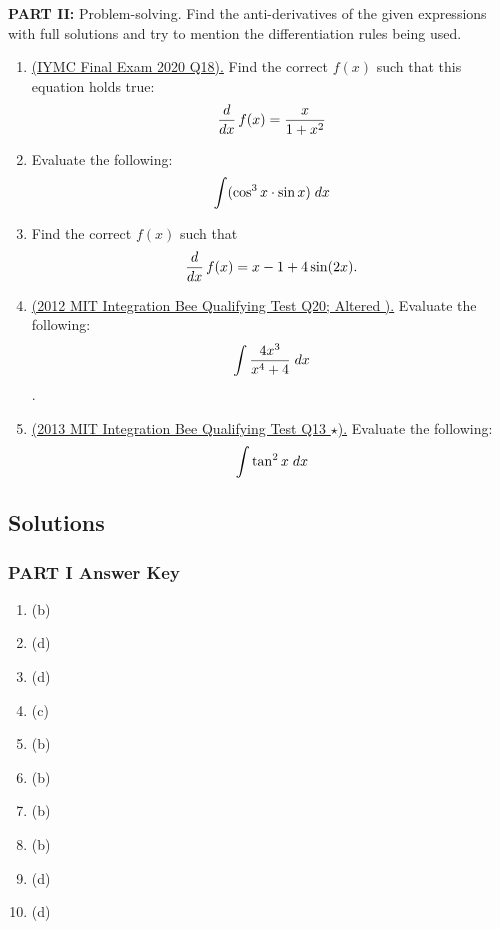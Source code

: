\documentclass[10pt,paper=letter]{scrartcl}
\begin{document}
\raggedright \textbf{PART II:} Problem-solving. Find the anti-derivatives of the given expressions with full solutions and try to mention the differentiation rules being used.

\begin{enumerate}[resume, label=\arabic*.,font=\bfseries]

\item \textsf{\href{https://iymc.info/docs/problems/2020/Final-Exam-2020.pdf}{(IYMC Final Exam 2020 Q18).}}  Find the correct $f(x)$ such that this equation holds true: $$\frac{d}{dx}\, f(x) = \dfrac{x}{1+x^2}$$


\item Evaluate the following: $$\int (\cos^3 x \cdot \sin x) \hspace{1mm} dx $$

\item Find the correct $f(x)$ such that $$\frac{d}{dx}\, f(x) =x-1+4\sin(2x).$$

\item \textsf{\href{http://web.mit.edu/abhinavk/www/integrationbee/qual2012.pdf}{(2012 MIT Integration Bee Qualifying Test Q20; Altered ).}} Evaluate the following: $$\int \dfrac{4x^3}{x^4 +4} \hspace{1mm} dx$$. 

\item \textsf{\href{https://math.mit.edu/~sswatson/pdfs/qualifying_round_2013.pdf}{(2013 MIT Integration Bee Qualifying Test Q13 $\star$).}} Evaluate the following: $$\int \tan^2 x \hspace{1mm} dx$$

\end{enumerate}

\newpage

\subsection{Solutions}


\subsubsection{PART I Answer Key}

\begin{enumerate}[label=\arabic*.,font=\bfseries]
\item (b)
\item (d)
\item (d)
\item (c)
\item (b)
\item (b)
\item (b)
\item (b)
\item (d)
\item (d)
\end{enumerate}
\end{document}
